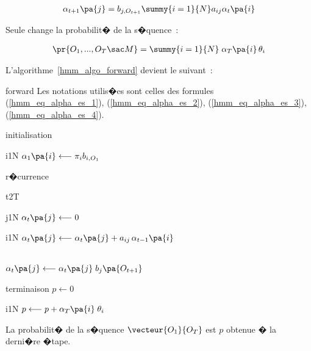         \begin{eqnarray}
        \alpha_{t+1} \pa{j}  = b_{j,O_{t+1}} \summy{i=1}{N} a_{ij}\alpha_{t}\pa{i} \label{hmm_eq_alpha_es_3}
        \end{eqnarray}

Seule change la probabilit� de la s�quence~:

        \begin{eqnarray}
        \pr{  O_{1},...,O_{T} \sac  M}  = \summy{i=1}{N} \; \alpha_{T} \pa{i} \,\theta_{i} \label{hmm_eq_alpha_es_4}
        \end{eqnarray}


L'algorithme~\ref{hmm_algo_forward} devient le suivant~:

        \begin{xalgorithm}{forward} \label{hmm_algo_forward_es}
        Les notations utilis�es sont celles des formules (\ref{hmm_eq_alpha_es_1}), (\ref{hmm_eq_alpha_es_2}),
        (\ref{hmm_eq_alpha_es_3}), (\ref{hmm_eq_alpha_es_4}).
        
        \begin{xalgostep}{initialisation}
                \begin{xfor}{i}{1}{N}
                $\alpha_1\pa{i} \longleftarrow \pi_{i}b_{i,O_{1}}$
                \end{xfor}
        \end{xalgostep}
        
        \begin{xalgostep}{r�currence}
                \begin{xfor}{t}{2}{T}
                        \begin{xfor}{j}{1}{N}
                                $\alpha_{t}\pa{j} \longleftarrow 0$ \\
                                \begin{xfor}{i}{1}{N}
                                        $\alpha_{t}\pa{j} \longleftarrow \alpha_{t}\pa{j} + a_{ij} \, \alpha_{t-1} \pa{i}$
                                \end{xfor} \\
                                $\alpha_{t}\pa{j} \longleftarrow \alpha_{t}\pa{j} \; b_{j}\pa{O_{t+1}}$
                        \end{xfor}
                \end{xfor}
        \end{xalgostep}
        
        \begin{xalgostep}{terminaison}
                $p \longleftarrow 0$ \\
                \begin{xfor}{i}{1}{N}
                        $p \longleftarrow p + \alpha_{T}\pa{i} \; \theta_i$
                \end{xfor}
        \end{xalgostep}
        
        La probabilit� de la s�quence $\vecteur{O_1}{O_T}$ est $p$ obtenue � la derni�re �tape.
        
        \end{xalgorithm}
        
